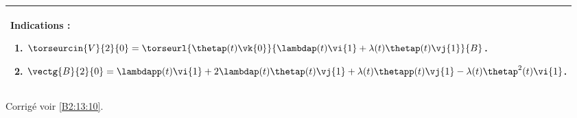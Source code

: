 \ifprof
\else
\footnotesize
\begin{center}
\begin{tabular}{|p{.9\linewidth}|}
\hline
Indications :
\begin{enumerate}
\item $\torseurcin{V}{2}{0} = \torseurl{\thetap(t)\vk{0}}{\lambdap(t) \vi{1}+\lambda(t)\thetap(t)\vj{1}}{B}$.
\item $\vectg{B}{2}{0} = \lambdapp(t) \vi{1}+2 \lambdap(t) \thetap(t) \vj{1}+\lambda(t)\thetapp(t)\vj{1}-\lambda(t)\thetap^2(t)\vi{1} $.
\end{enumerate} \\ \hline
\end{tabular}
\end{center}
\normalsize
\begin{flushright}
\footnotesize{Corrigé  voir \ref{B2:13:10}.}
\end{flushright}%
\fi